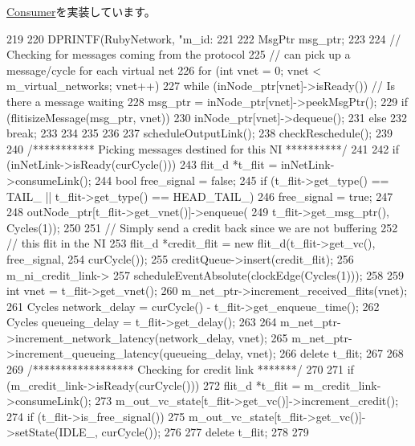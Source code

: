 \hyperlink{classConsumer_a623e3e7d1b1c725d70009f7b01a421b9}{Consumer}を実装しています。


\begin{DoxyCode}
219 {
220     DPRINTF(RubyNetwork, "m_id: %
221 
222     MsgPtr msg_ptr;
223 
224     // Checking for messages coming from the protocol
225     // can pick up a message/cycle for each virtual net
226     for (int vnet = 0; vnet < m_virtual_networks; vnet++) {
227         while (inNode_ptr[vnet]->isReady()) { // Is there a message waiting
228             msg_ptr = inNode_ptr[vnet]->peekMsgPtr();
229             if (flitisizeMessage(msg_ptr, vnet)) {
230                 inNode_ptr[vnet]->dequeue();
231             } else {
232                 break;
233             }
234         }
235     }
236 
237     scheduleOutputLink();
238     checkReschedule();
239 
240     /*********** Picking messages destined for this NI **********/
241 
242     if (inNetLink->isReady(curCycle())) {
243         flit_d *t_flit = inNetLink->consumeLink();
244         bool free_signal = false;
245         if (t_flit->get_type() == TAIL_ || t_flit->get_type() == HEAD_TAIL_) {
246             free_signal = true;
247 
248             outNode_ptr[t_flit->get_vnet()]->enqueue(
249                 t_flit->get_msg_ptr(), Cycles(1));
250         }
251         // Simply send a credit back since we are not buffering
252         // this flit in the NI
253         flit_d *credit_flit = new flit_d(t_flit->get_vc(), free_signal,
254                                          curCycle());
255         creditQueue->insert(credit_flit);
256         m_ni_credit_link->
257             scheduleEventAbsolute(clockEdge(Cycles(1)));
258 
259         int vnet = t_flit->get_vnet();
260         m_net_ptr->increment_received_flits(vnet);
261         Cycles network_delay = curCycle() - t_flit->get_enqueue_time();
262         Cycles queueing_delay = t_flit->get_delay();
263 
264         m_net_ptr->increment_network_latency(network_delay, vnet);
265         m_net_ptr->increment_queueing_latency(queueing_delay, vnet);
266         delete t_flit;
267     }
268 
269     /****************** Checking for credit link *******/
270 
271     if (m_credit_link->isReady(curCycle())) {
272         flit_d *t_flit = m_credit_link->consumeLink();
273         m_out_vc_state[t_flit->get_vc()]->increment_credit();
274         if (t_flit->is_free_signal()) {
275             m_out_vc_state[t_flit->get_vc()]->setState(IDLE_, curCycle());
276         }
277         delete t_flit;
278     }
279 }
\end{DoxyCode}


